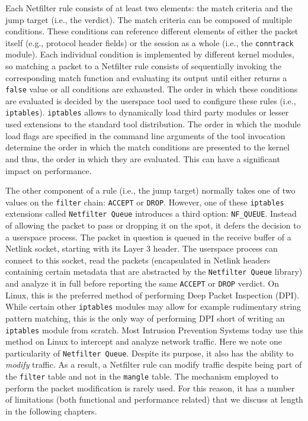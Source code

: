 Each Netfilter rule consists of at least two elements: the match criteria and
the jump target (i.e., the verdict). The match criteria can be composed of
multiple conditions. These conditions can reference different elements of either
the packet itself (e.g., protocol header fields) or the session as a whole (i.e.,
the \texttt{conntrack} module). Each individual condition is implemented by
different kernel modules, so matching a packet to a Netfilter rule consists of
sequentially invoking the corresponding match function and evaluating its output
until either returns a \texttt{false} value or all conditions are exhausted.
The order in which these conditions are evaluated is decided by the userspace
tool used to configure these rules (i.e., \texttt{iptables}). \texttt{iptables}
allows to dynamically load third party modules or lesser used extensions to
the standard tool distribution. The order in which the module load flags are
specified in the command line arguments of the tool invocation determine the
order in which the match conditions are presented to the kernel and thus, the
order in which they are evaluated. This can have a significant impact on
performance.

The other component of a rule (i.e., the jump target) normally takes one of two
values on the \texttt{filter} chain: \texttt{ACCEPT} or \texttt{DROP}. However,
one of these \texttt{iptables} extensions called \texttt{Netfilter Queue} introduces
a third option: \texttt{NF\_QUEUE}. Instead of allowing the packet to pass or
dropping it on the spot, it defers the decision to a userspace process. The
packet in question is queued in the receive buffer of a Netlink socket, starting
with its Layer 3 header. The userspace process can connect to this socket,
read the packets (encapsulated in Netlink headers containing certain metadata
that are abstracted by the \texttt{Netfilter Queue} library) and analyze it in full before
reporting the same \texttt{ACCEPT} or \texttt{DROP} verdict. On Linux, this is
the preferred method of performing Deep Packet Inspection (DPI). While certain other
\texttt{iptables} modules may allow for example rudimentary string pattern
matching, this is the only way of performing DPI short of writing an \texttt{iptables}
module from scratch. Most Intrusion Prevention Systems today use this method on
Linux to intercept and analyze network traffic. Here we note one particularity
of \texttt{Netfilter Queue}. Despite its purpose, it also has the ability to
\textit{modify} traffic. As a result, a Netfilter rule can modify traffic despite
being part of the \texttt{filter} table and not in the \texttt{mangle} table. The
mechanism employed to perform the packet modification is rarely used. For this
reason, it has a number of limitations (both functional and performance related)
that we discuss at length in the following chapters.

